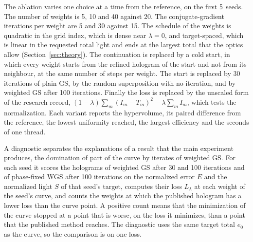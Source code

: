 The ablation varies one choice at a time from the reference, on the first $5$ seeds. The number of weights is 5, 10 and 40 against 20. The conjugate-gradient iterations per weight are 5 and 30 against 15. The schedule of the weights is quadratic in the grid index, which is dense near $\lambda=0$, and target-spaced, which is linear in the requested total light and ends at the largest
total that the optics allow (Section~\ref{sec:theory}). The continuation is replaced by a cold start, in which every weight starts from the refined hologram of the start and not from its neighbour, at the same number of steps per weight. The start is replaced by 30 iterations of plain GS, by the random superposition with no iteration, and by weighted GS after 100 iterations. Finally the loss is replaced by the unscaled form of the research record,
$(1-\lambda)\sum_m(I_m-T_m)^2-\lambda\sum_mI_m$, which tests the normalization. Each variant reports the hypervolume, its paired difference from the reference, the lowest uniformity reached, the largest efficiency and the seconds of one thread.

A diagnostic separates the explanations of a result that the main experiment produces, the domination of part of the curve by iterates of weighted GS. For each seed it scores the holograms of weighted GS after 30 and 100 iterations and of phase-fixed WGS after 100 iterations on the normalized error $E$ and the normalized light $S$ of that seed's target, computes their loss $L_\lambda$ at each weight of the seed's curve, and counts the weights at which the published hologram has a lower loss
than the curve point. A positive count means that the minimization of the curve stopped at a point that is worse, on the loss it minimizes, than a point that the published method reaches. The diagnostic uses the same target total $e_0$ as the curve, so the comparison is on one loss.
